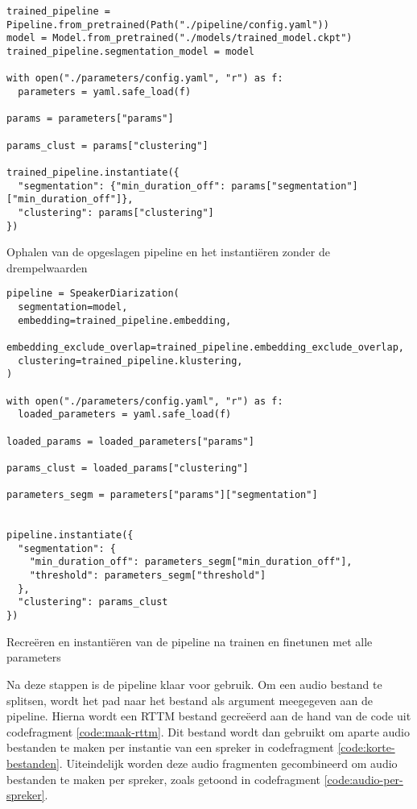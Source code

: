\begin{listing}
	\begin{verbatim}
trained_pipeline = Pipeline.from_pretrained(Path("./pipeline/config.yaml"))
model = Model.from_pretrained("./models/trained_model.ckpt")
trained_pipeline.segmentation_model = model

with open("./parameters/config.yaml", "r") as f:
  parameters = yaml.safe_load(f)

params = parameters["params"]

params_clust = params["clustering"]

trained_pipeline.instantiate({
  "segmentation": {"min_duration_off": params["segmentation"]["min_duration_off"]},
  "clustering": params["clustering"]
})
	\end{verbatim}
	\caption[Ophalen en instantiëren opgeslagen pipeline]{\label{code:eerste-stap}Ophalen van de opgeslagen pipeline en het instantiëren zonder de drempelwaarden}
\end{listing}

\begin{listing}
	\begin{verbatim}
pipeline = SpeakerDiarization(
  segmentation=model,
  embedding=trained_pipeline.embedding,
  embedding_exclude_overlap=trained_pipeline.embedding_exclude_overlap,
  clustering=trained_pipeline.klustering,
)

with open("./parameters/config.yaml", "r") as f:
  loaded_parameters = yaml.safe_load(f)

loaded_params = loaded_parameters["params"]

params_clust = loaded_params["clustering"]

parameters_segm = parameters["params"]["segmentation"]


pipeline.instantiate({
  "segmentation": {
    "min_duration_off": parameters_segm["min_duration_off"],
    "threshold": parameters_segm["threshold"]
  },
  "clustering": params_clust
})
	\end{verbatim}
	\caption[Recreëren van de getrainde pipeline met alle parameters]{\label{code:tweede-stap}Recreëren en instantiëren van de pipeline na trainen en finetunen met alle parameters}
\end{listing}

Na deze stappen is de pipeline klaar voor gebruik. Om een audio bestand te splitsen, wordt het pad naar het bestand als argument meegegeven aan de pipeline. Hierna wordt een RTTM bestand gecreëerd aan de hand van de code uit codefragment \ref{code:maak-rttm}. Dit bestand wordt dan gebruikt om aparte audio bestanden te maken per instantie van een spreker in codefragment \ref{code:korte-bestanden}. Uiteindelijk worden deze audio fragmenten gecombineerd om audio bestanden te maken per spreker, zoals getoond in codefragment \ref{code:audio-per-spreker}.


